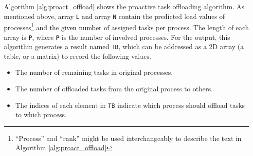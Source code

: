 \begin{algorithm}[t]
  \nl {}
  \nl {}   
\end{algorithm}

Algorithm \ref{alg:proact_offload} shows the proactive task offloading algorithm. As mentioned above, array \texttt{L} and array \texttt{N} contain the predicted load values of processes\footnote{``Process'' and ``rank'' might be used interchangeably to describe the text in Algorithm \ref{alg:proact_offload}} and the given number of assigned tasks per process. The length of each array is \texttt{P}, where \texttt{P} is the number of involved processes. For the output, this algorithm generates a result named \texttt{TB}, which can be addressed as a 2D array (a table, or a matrix) to record the following values.
\begin{itemize}
	\item The number of remaining tasks in original processes.
	\item The number of offloaded tasks from the original process to others.
	\item The indices of each element in \texttt{TB} indicate which process should offload tasks to which process.
\end{itemize}

